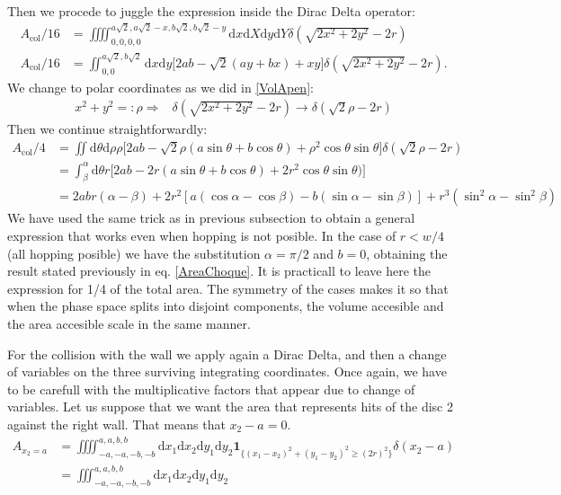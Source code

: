 \documentclass[letterpaper,10pt, jcp, aps]{revtex4-1}
\newcommand{\rd}{\!\mathrm{d}}
\newcommand{\indicator}[1]{\mathbf{1}_{ \{   #1 \} } }
\begin{document}
  Then we procede to juggle the expression inside the Dirac Delta operator:
  \begin{align}
    A_\text{col}/16 & =\iiiint _{0,0,0,0}^{a\sqrt{2},a\sqrt{2}-x,b\sqrt{2},b\sqrt{2}-y}
    \rd x \rd X \rd y \rd Y
    \delta (\sqrt{2x^2+2y^2}-2r)\\
    A_\text{col}/16 & =\iint _{0,0}^{a\sqrt{2},b\sqrt{2}}
    \rd x \rd y 
   \bigl[ 2ab-\sqrt{2}(ay+bx)+xy \bigr]
    \delta (\sqrt{2x^2+2y^2}-2r).
    \end{align}
  We change to polar coordinates as we did in \ref{VolApen}:
  \begin{align}
    x^2+y^2 =: \rho   \Rightarrow &  \delta(\sqrt{2x^2+2y^2}-2r) \rightarrow
    \delta(\sqrt{2}\rho-2r)   
    \end{align}
  Then we continue straightforwardly:
    \begin{align}
    A_\text{col}/4 & =\iint 
    \rd \theta \rd \rho \rho
    \bigl[2ab-\sqrt{2}\rho(a\sin\theta+b\cos\theta)+\rho^2\cos\theta\sin\theta
      \bigr]
    \delta(\sqrt{2}\rho-2r) \\
    &=\int_\beta^\alpha \rd \theta r
    \bigl[
      2ab-2r(a\sin\theta+b\cos\theta)+2r^2\cos\theta\sin\theta)
      \bigr] \\
    & = 2abr(\alpha-\beta) + 2r^2 [a (\cos \alpha-\cos\beta) -b (\sin\alpha -\sin\beta)]
    +r^3(\sin^2 \alpha -\sin^2\beta)
    \end{align}
    We have used the same trick as in previous subsection to obtain a general expression
    that works even when hopping is not posible. In the case of $r<w/4$ (all hopping posible)
    we have the substitution $\alpha=\pi/2$ and $b=0$, obtaining the result stated previously
    in eq. \ref{AreaChoque}. It is practicall to leave here the expression for 1/4 of the
    total area. The symmetry of the cases makes it so that when the phase space splits
    into disjoint components, the volume accesible and the area accesible scale in
    the same manner.
    

    For the collision with the wall we apply again a Dirac Delta, and then a change
    of variables on the three surviving integrating coordinates. Once again, we
    have to be carefull with the multiplicative factors that appear due to change
    of variables. Let us suppose that we want the area that represents hits of
    the disc 2 against the right wall. That means that $x_2-a=0$. 
    \begin{align}
      A_{x_2=a} & =\iiiint_{-a,-a,-b,-b}^{a,a,b,b} \rd x_1 \rd x_2 \rd y_1 \rd y_2 
      \indicator{(x_1-x_2)^2+(y_1-y_2)^2 \geq (2 r)^2} \delta (x_2-a)\\
      &=\iiint _{-a,-a,-b,-b}^{a,a,b,b} \rd x_1 \rd x_2 \rd y_1 \rd y_2 
    \end{align}
\end{document}
